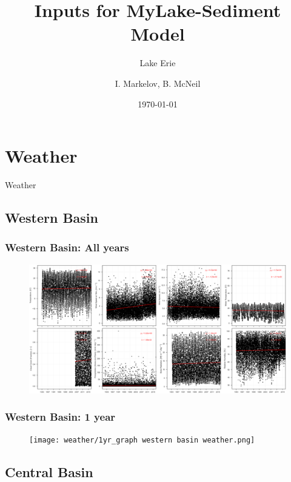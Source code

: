 \documentclass{beamer}
\title{Inputs for MyLake-Sediment Model}
\subtitle{Lake Erie}
\author{I. Markelov, B. McNeil}
\institute{Ecohydrology}
\date{\today}
\begin{document}
\begin{frame}
\titlepage
\end{frame}


\begin{frame}
\begin{multicols}{2}
\tableofcontents
\end{multicols}
\end{frame}

\section{Weather}

\begin{frame}
\begin{center}
\Huge Weather
\end{center}
\end{frame}

\subsection{Western Basin}


\begin{frame}
\frametitle{Western Basin: All years}
\begin{figure}
\includegraphics[width=\textwidth]{weather/all_years western basin weather.png}
\end{figure}
\end{frame}

\begin{frame}
\frametitle{Western Basin: 1 year}
\begin{figure}
\texttt{[image: weather/1yr\_graph  western basin weather.png]}
\end{figure}
\end{frame}


\subsection{Central Basin}
\end{document}

